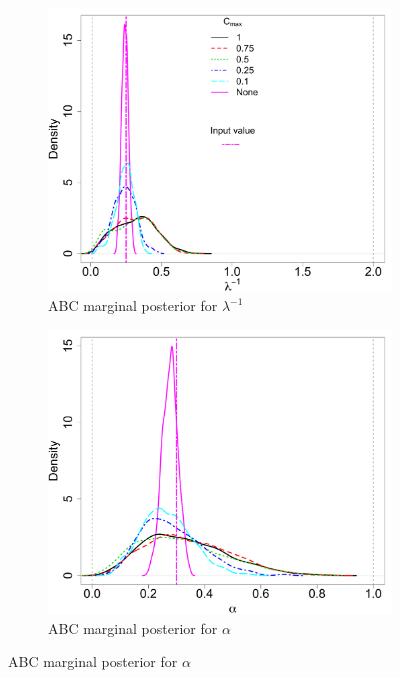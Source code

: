 \documentclass[ejs]{imsart}
\numberwithin{equation}{section}
\theoremstyle{plain}
\begin{document}
\begin{figure}[htbp]
   \centering
\begin{subfigure}{0.48\textwidth}
\centering
\includegraphics[width = \textwidth]{figures/marg_k_obs.pdf} 
\caption{ABC marginal posterior for $\lambda^{-1}$}\label{subfig:marg_k_obs}
\end{subfigure}
\begin{subfigure}{0.48\textwidth}
\centering
\includegraphics[width = \textwidth]{figures/marg_alpha_obs.pdf} 
\caption{ABC marginal posterior for  $\alpha$}\label{subfig:marg_alpha_obs} 

\end{subfigure}
\end{figure}
\end{document}
